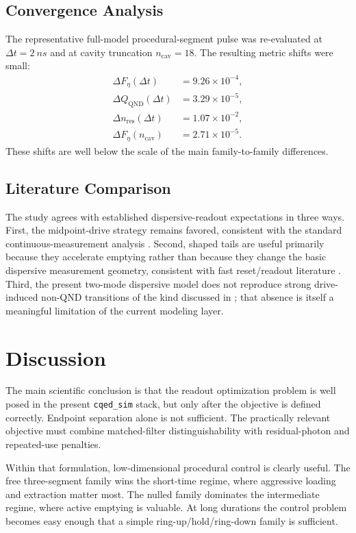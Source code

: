 \documentclass[11pt, a4paper]{article}
\begin{document}
\subsection{Convergence Analysis}
The representative full-model procedural-segment pulse was re-evaluated at
$\Delta t=\SI{2}{ns}$ and at cavity truncation $n_{\mathrm{cav}}=18$. The resulting
metric shifts were small:
\begin{align*}
\Delta F_\eta(\Delta t) &= 9.26\times 10^{-4}, \\
\Delta Q_{\mathrm{QND}}(\Delta t) &= 3.29\times 10^{-5}, \\
\Delta n_{\mathrm{res}}(\Delta t) &= 1.07\times 10^{-2}, \\
\Delta F_\eta(n_{\mathrm{cav}}) &= 2.71\times 10^{-5}.
\end{align*}
These shifts are well below the scale of the main family-to-family differences.

\subsection{Literature Comparison}
The study agrees with established dispersive-readout expectations in three ways.
First, the midpoint-drive strategy remains favored, consistent with the standard
continuous-measurement analysis \cite{gambetta2007protocols}. Second, shaped tails are
useful primarily because they accelerate emptying rather than because they change the basic
dispersive measurement geometry, consistent with fast reset/readout literature
\cite{mcclure2016rapid,jeffrey2014fast,walter2017rapid}. Third, the present two-mode
dispersive model does not reproduce strong drive-induced non-QND transitions of the kind
discussed in \cite{sank2016measurement}; that absence is itself a meaningful limitation of
the current modeling layer.

\section{Discussion}
The main scientific conclusion is that the readout optimization problem is well posed in
the present \texttt{cqed\_sim} stack, but only after the objective is defined correctly.
Endpoint separation alone is not sufficient. The practically relevant objective must
combine matched-filter distinguishability with residual-photon and repeated-use penalties.

Within that formulation, low-dimensional procedural control is clearly useful. The free
three-segment family wins the short-time regime, where aggressive loading and extraction
matter most. The nulled family dominates the intermediate regime, where active emptying is
valuable. At long durations the control problem becomes easy enough that a simple
ring-up/hold/ring-down family is sufficient.
\end{document}
